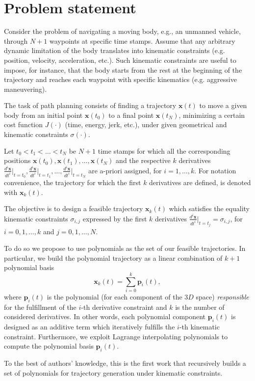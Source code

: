 \section{Problem statement}
\label{subsec:rst_problem}
Consider the problem of navigating a moving body, e.g., an unmanned vehicle, through $N+1$ waypoints at specific time stamps. Assume that any arbitrary dynamic limitation of the  body translates into kinematic constraints (e.g. position, velocity, acceleration, etc.). Such kinematic constraints are useful to impose, for instance, that the body starts from the rest at the beginning of the trajectory and reaches each waypoint with specific kinematics (e.g. aggressive maneuvering).

The task of path planning consists of finding a trajectory $\mathbf{x}(t)$ to move a given body from an initial point $\mathbf{x}(t_0)$ to a final point $\mathbf{x}(t_N)$, minimizing a certain cost function $J(\cdot)$ (time, energy, jerk, etc.), under given geometrical and kinematic constraints $\sigma(\cdot)$.

Let $t_0<t_1<\dots<t_N$ be $N+1$ time stamps for which all the corresponding positions $\mathbf{x}(t_0),\mathbf{x}(t_1), \dots, \mathbf{x}(t_N)$ and the respective $k$ derivatives $\frac{d^i\mathbf{x}}{dt^i}\bigr|_{t=t_0}, \frac{d^i\mathbf{x}}{dt^i}\bigr|_{t=t_1}, \dots, \frac{d^i\mathbf{x}}{dt^i}\bigr|_{t=t_N}$ are a-priori assigned, for $i = 1,\dots, k$. For notation convenience, the trajectory for which the first $k$ derivatives are defined, is denoted with $\mathbf{x}_k(t)$.

The objective is to design a feasible trajectory $\mathbf{x}_k(t)$ which satisfies the equality kinematic constraints $\sigma_{i,j}$ expressed by the first $k$ derivatives $\frac{d^i\mathbf{x}}{dt^i}\bigr|_{t=t_j} = \sigma_{i,j} $, for $i=0,1,\dots,k$ and $j=0,1,\dots,N$. 

To do so we propose to use polynomials as the set of our feasible trajectories. In particular, we build the polynomial trajectory as a linear combination of $k+1$ polynomial basis
\begin{equation}
\label{eq:rst_trajectory}
\mathbf{x}_k(t) = \sum_{i=0}^{k}{\mathbf{p}_i(t)},
\end{equation}
where $\mathbf{p}_i(t)$ is the polynomial (for each component of the $3D$ space) \textit{responsible} for the fulfillment of the $i$-th derivative constraint and $k$ is the number of considered derivatives. In other words, each polynomial component $\mathbf{p}_i(t)$ is designed as an additive term which iteratively fulfills the $i$-th kinematic constraint.
Furthermore, we exploit Lagrange interpolating polynomials to compute the polynomial basis $\mathbf{p}_i(t)$.

To the best of authors' knowledge, this is the first work that recursively builds a set of polynomials for trajectory generation under kinematic constraints.





